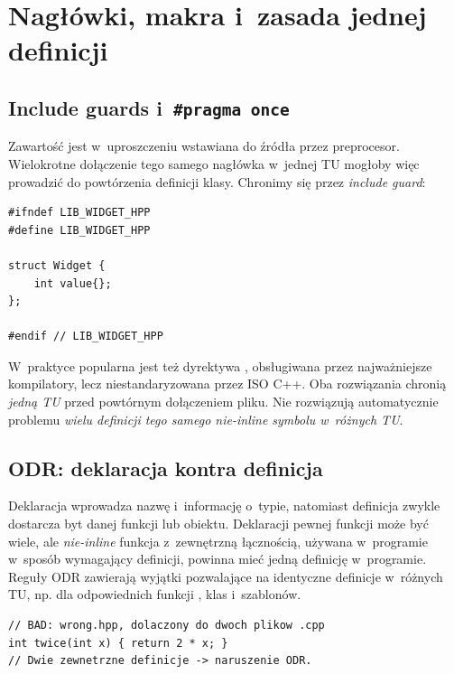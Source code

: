 \section{Nagłówki, makra i~zasada jednej definicji}
\label{sec:cpp17-headers-odr}

\subsection{Include guards i~\texttt{\#pragma once}}

Zawartość  jest w~uproszczeniu wstawiana do źródła
przez preprocesor. Wielokrotne dołączenie tego samego nagłówka
w~jednej TU mogłoby więc prowadzić do powtórzenia definicji klasy.
Chronimy się przez \emph{include guard}:

\begin{lstlisting}[caption={Klasyczna osłona nagłówka.}]
#ifndef LIB_WIDGET_HPP
#define LIB_WIDGET_HPP

struct Widget {
    int value{};
};

#endif // LIB_WIDGET_HPP
\end{lstlisting}

W~praktyce popularna jest też dyrektywa ,
obsługiwana przez najważniejsze kompilatory, lecz niestandaryzowana
przez ISO C++. Oba rozwiązania chronią \emph{jedną TU} przed
powtórnym dołączeniem pliku. Nie rozwiązują automatycznie problemu
\emph{wielu definicji tego samego nie-inline symbolu w~różnych TU}.

\subsection{ODR: deklaracja kontra definicja}

Deklaracja wprowadza nazwę i~informację o~typie, natomiast definicja
zwykle dostarcza byt danej funkcji lub obiektu. Deklaracji pewnej
funkcji może być wiele, ale \emph{nie-inline} funkcja z~zewnętrzną
łącznością, używana w~programie w~sposób wymagający definicji,
powinna mieć jedną definicję w~programie. Reguły ODR zawierają
wyjątki pozwalające na identyczne definicje w~różnych TU, np. dla
odpowiednich funkcji , klas i~szablonów.

\begin{lstlisting}[caption={Typowa pułapka: definicja zwykłej funkcji w nagłówku.}]
// BAD: wrong.hpp, dolaczony do dwoch plikow .cpp
int twice(int x) { return 2 * x; }
// Dwie zewnetrzne definicje -> naruszenie ODR.
\end{lstlisting}


